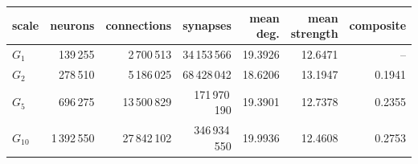 {\small\setlength{\tabcolsep}{3pt}
\begin{tabular}{l r r r r r r}
\toprule
scale & neurons & connections & synapses & mean deg. & mean strength & composite \\
\midrule
$G_1$ & 139\,255 & 2\,700\,513 & 34\,153\,566 & 19.3926 & 12.6471 & -- \\
$G_{2}$ & 278\,510 & 5\,186\,025 & 68\,428\,042 & 18.6206 & 13.1947 & 0.1941 \\
$G_{5}$ & 696\,275 & 13\,500\,829 & 171\,970\,190 & 19.3901 & 12.7378 & 0.2355 \\
$G_{10}$ & 1\,392\,550 & 27\,842\,102 & 346\,934\,550 & 19.9936 & 12.4608 & 0.2753 \\
\bottomrule
\end{tabular}

}
